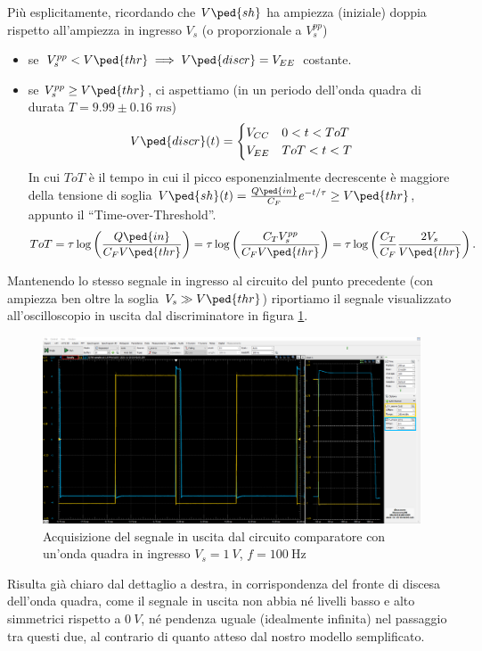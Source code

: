 \documentclass[10pt, a4paper, italian]{article}
\begin{document}
Più esplicitamente, ricordando che $V\ped{sh}$ ha ampiezza (iniziale) doppia
rispetto all'ampiezza in ingresso $V_s$ (o proporzionale a $V_s^{pp}$)
\begin{itemize}
\item se $V_s^{pp} < V\ped{thr} \implies V\ped{discr} = V_{EE}$ costante.
\item se $V_s^{pp} \geq V\ped{thr}$, ci aspettiamo (in un periodo dell'onda
quadra di durata $T = 9.99 \pm 0.16 \; \si{m\s}$)
\[
V\ped{discr}(t) =
\begin{cases}
V_{CC} & 0 < t < ToT \\
V_{EE} & ToT < t < T
\end{cases}
\]
In cui $ToT$ è il tempo in cui il picco esponenzialmente decrescente è
maggiore della tensione di soglia
$V\ped{sh}(t) = \frac{Q\ped{in}}{C_F} e^{-t/\tau} \geq V\ped{thr}$, appunto il
``Time-over-Threshold''.
\begin{equation} \label{eq:ToT}
ToT = \tau \log\left(\frac{Q\ped{in}}{C_F V\ped{thr}}\right) =
\tau \log\left(\frac{C_T V_s^{pp}}{C_F V\ped{thr}}\right) = 
\tau \log\left(\frac{C_T}{C_F} \frac{2 V_s}{V\ped{thr}}\right).
  \end{equation}
\end{itemize}

Mantenendo lo stesso segnale in ingresso al circuito del punto precedente
(con ampiezza ben oltre la soglia $V_s \gg V\ped{thr}$) riportiamo il
segnale visualizzato all'oscilloscopio in uscita dal discriminatore in figura
\ref{fig: discr}.
\begin{figure}[htbp]
\centering
\includegraphics[scale=0.335]{discrzoom}
\caption{Acquisizione del segnale in uscita dal circuito comparatore con
un'onda quadra in ingresso $V_s = \SI{1}{V}$, $f = \SI{100}{\Hz}$
\label{fig: discr}}
\end{figure}

Risulta già chiaro dal dettaglio a destra, in corrispondenza del fronte di
discesa dell'onda quadra, come il segnale in uscita non abbia né livelli basso
e alto simmetrici rispetto a $\SI{0}{V}$, né pendenza uguale (idealmente
infinita) nel passaggio tra questi due, al contrario di quanto atteso dal
nostro modello semplificato.
\end{document}
